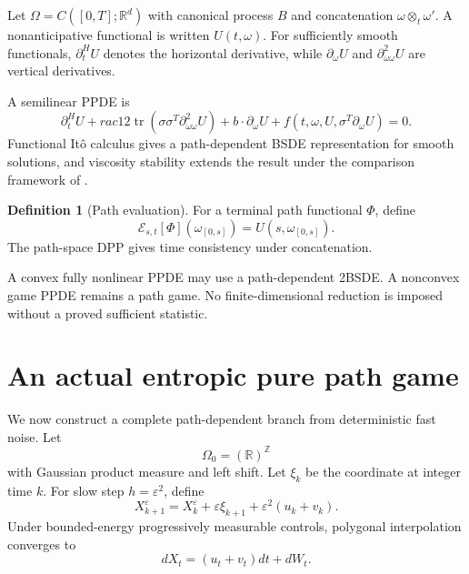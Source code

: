\documentclass[11pt,reqno]{amsart}
\theoremstyle{definition}
\newtheorem{definition}[theorem]{Definition}
\theoremstyle{remark}
\newcommand{\R}{\mathbb R}
\newcommand{\cE}{\mathcal E}
\newcommand{\tr}{\operatorname{tr}}
\begin{document}
Let $\Omega=C([0,T];\R^d)$ with canonical process $B$ and concatenation
$\omega\otimes_t\omega'$.  A nonanticipative functional is written
$U(t,\omega)$.  For sufficiently smooth functionals, $\partial_t^HU$ denotes
the horizontal derivative, while $\partial_\omega U$ and
$\partial_{\omega\omega}^2U$ are vertical derivatives.

A semilinear PPDE is
\begin{equation}\label{eq:semilinear-PPDE}
 \partial_t^HU+rac12\tr(\sigma\sigma^T
 \partial_{\omega\omega}^2U)
 +b\cdot\partial_\omega U
 +f(t,\omega,U,\sigma^T\partial_\omega U)=0.
\end{equation}
Functional It\^o calculus gives a path-dependent BSDE representation for smooth
solutions, and viscosity stability extends the result under the comparison
framework of \cite{EkrenTouziZhang2014I,EkrenTouziZhang2014II}.

\begin{definition}[Path evaluation]
For a terminal path functional $\Phi$, define
\begin{equation}\label{eq:path-evaluation}
 \cE_{s,t}[\Phi](\omega_{[0,s]})=U(s,\omega_{[0,s]}).
\end{equation}
The path-space DPP gives time consistency under concatenation.
\end{definition}

A convex fully nonlinear PPDE may use a path-dependent 2BSDE.  A nonconvex game
PPDE remains a path game.  No finite-dimensional reduction is imposed without
a proved sufficient statistic.

\section{An actual entropic pure path game}\label{sec:entropic}

We now construct a complete path-dependent branch from deterministic fast
noise.  Let
\[
 \Omega_0=(\R)^{\mathbb Z}
\]
with Gaussian product measure and left shift.  Let $\xi_k$ be the coordinate at
integer time $k$.  For slow step $h=\varepsilon^2$, define
\begin{equation}\label{eq:prelimit-drift-game}
 X_{k+1}^\varepsilon=X_k^\varepsilon
 +\varepsilon\xi_{k+1}
 +\varepsilon^2(u_k+v_k).
\end{equation}
Under bounded-energy progressively measurable controls, polygonal interpolation
converges to
\begin{equation}\label{eq:drift-game-SDE}
 dX_t=(u_t+v_t)dt+dW_t.
\end{equation}
\end{document}
